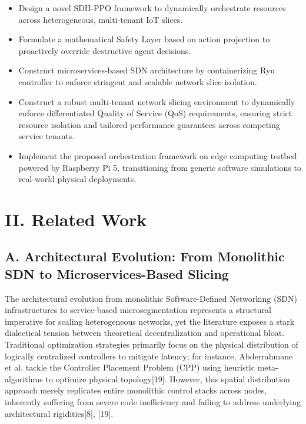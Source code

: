 \begin{itemize}
\item
  Design a novel SDH-PPO framework to dynamically orchestrate resources across heterogeneous, multi-tenant IoT slices.
\item
  Formulate a mathematical Safety Layer based on action projection to proactively override destructive agent decisions.
\item
  Construct microservices-based SDN architecture by containerizing Ryu controller to enforce stringent and scalable network slice isolation.
\item
  Construct a robust multi-tenant network slicing environment to dynamically enforce differentiated Quality of Service (QoS) requirements, ensuring strict resource isolation and tailored performance guarantees across competing service tenants.
\item
  Implement the proposed orchestration framework on edge computing testbed powered by Raspberry Pi 5, transitioning from generic software simulations to real-world physical deployments.
\end{itemize}

\section{II. Related Work}\label{ii.-related-work}

\subsection{A. Architectural Evolution: From Monolithic SDN to Microservices-Based Slicing}\label{a.-architectural-evolution-from-monolithic-sdn-to-microservices-based-slicing}

The architectural evolution from monolithic Software-Defined Networking (SDN) infrastructures to service-based microsegmentation represents a structural imperative for scaling heterogeneous networks, yet the literature exposes a stark dialectical tension between theoretical decentralization and operational bloat. Traditional optimization strategies primarily focus on the physical distribution of logically centralized controllers to mitigate latency; for instance, Abderrahmane et al. tackle the Controller Placement Problem (CPP) using heuristic meta-algorithms to optimize physical topology{[}19{]}. However, this spatial distribution approach merely replicates entire monolithic control stacks across nodes, inherently suffering from severe code inefficiency and failing to address underlying architectural rigidities{[}8{]}, {[}19{]}.

